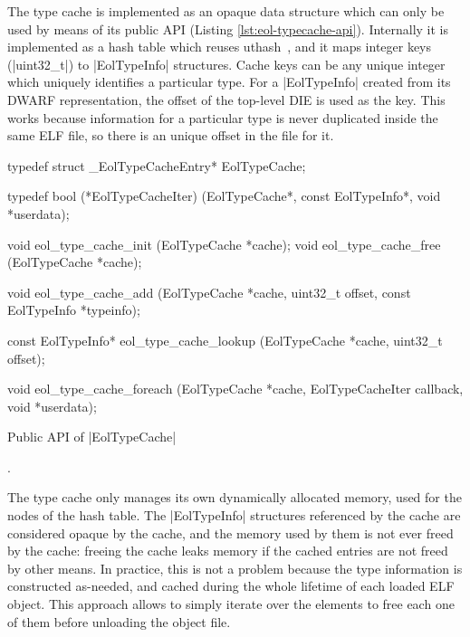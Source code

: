 The type cache is implemented as an opaque data structure which can only be
used by means of its public API (Listing \autoref{lst:eol-typecache-api}). Internally
it is implemented as a hash table which reuses uthash~\cite{uthash-guide}, and
it maps integer keys (\Mc|uint32_t|) to \Mc|EolTypeInfo| structures. Cache
keys can be any unique integer which uniquely identifies a particular type.
For a \Mc|EolTypeInfo| created from its DWARF representation, the offset of
the top-level \gls{DIE} is used as the key. This works because information for
a particular type is never duplicated inside the same ELF file, so there is an
unique offset in the file for it.

\begin{listing}[ht]
  \centering
\begin{ccode}
typedef struct _EolTypeCacheEntry* EolTypeCache;

typedef bool (*EolTypeCacheIter)  (EolTypeCache*,
                                   const EolTypeInfo*,
                                   void *userdata);

void eol_type_cache_init (EolTypeCache *cache);
void eol_type_cache_free (EolTypeCache *cache);

void eol_type_cache_add (EolTypeCache      *cache,
                         uint32_t           offset,
                         const EolTypeInfo *typeinfo);

const EolTypeInfo* eol_type_cache_lookup (EolTypeCache *cache,
                                          uint32_t      offset);

void eol_type_cache_foreach (EolTypeCache    *cache,
                             EolTypeCacheIter callback,
                             void             *userdata);
\end{ccode}
  \caption{Public API of \Mc|EolTypeCache|}.
  \label{lst:eol-typecache-api}
\end{listing}

The type cache only manages its own dynamically allocated memory, used for the
nodes of the hash table. The \Mc|EolTypeInfo| structures referenced by the
cache are considered opaque by the cache, and the memory used by them is not
ever freed by the cache: freeing the cache leaks memory if the cached entries
are not freed by other means. In practice, this is not a problem because the
type information is constructed as-needed, and cached during the whole
lifetime of each loaded ELF object. This approach allows to simply iterate
over the elements to free each one of them before unloading the object file.


